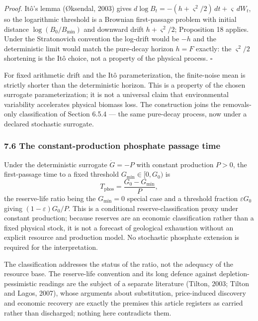 \documentclass[11pt]{article}
\begin{document}
\emph{Proof.} It\^o's lemma (\O{}ksendal, 2003) gives
\(d\log B_t = -(h + \varsigma^2/\allowbreak{}2)\, dt + \varsigma\, dW_t\), so the
logarithmic threshold is a Brownian first-passage problem with initial
distance \(\log(B_0/\allowbreak{}B_{\min})\) and downward drift
\(h + \varsigma^2/\allowbreak{}2\); Proposition 18 applies. Under the Stratonovich
convention the log-drift would be \(-h\) and the deterministic limit
would match the pure-decay horizon \(h = F\) exactly: the
\(\varsigma^2/\allowbreak{}2\) shortening is the It\^o choice, not a property of the
physical process. \ensuremath{\square}

For fixed arithmetic drift and the It\^o parameterization, the
finite-noise mean is strictly shorter than the deterministic horizon.
This is a property of the chosen surrogate parameterization; it is not a
universal claim that environmental variability accelerates physical
biomass loss. The construction joins the removals-only classification of
Section 6.5.4 --- the same pure-decay process, now under a declared
stochastic surrogate.

\subsubsection{7.6 The constant-production phosphate passage
time}\label{the-constant-production-phosphate-passage-time}

Under the deterministic surrogate \(\dot G = -P\) with constant
production \(P > 0\), the first-passage time to a fixed threshold
\(G_{\min} \in [0, G_0)\) is
\[T_{\mathrm{phos}} = \frac{G_0 - G_{\min}}{P},\] the reserve-life ratio
being the \(G_{\min} = 0\) special case and a threshold fraction
\(\varepsilon G_0\) giving \((1-\varepsilon)G_0/\allowbreak{}P\). This is a
conditional reserve-classification proxy under constant production;
because reserves are an economic classification rather than a fixed
physical stock, it is not a forecast of geological exhaustion without an
explicit resource and production model. No stochastic phosphate
extension is required for the interpretation.

The classification addresses the status of the ratio, not the adequacy of the resource base. The
reserve-life convention and its long defence against depletion-pessimistic readings are the subject of
a separate literature (Tilton, 2003; Tilton and Lagos, 2007), whose arguments about substitution,
price-induced discovery and economic recovery are exactly the premises this article registers as
carried rather than discharged; nothing here contradicts them.
\end{document}
